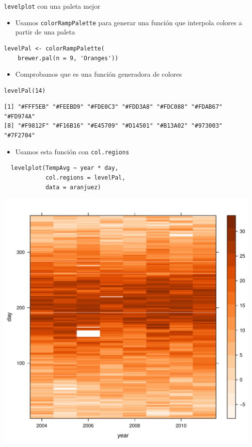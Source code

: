 \documentclass[xcolor={usenames,svgnames,dvipsnames}]{beamer}
\begin{document}
\begin{frame}[fragile,label=sec-2-1-36]{\texttt{levelplot} con una paleta mejor}
 \begin{itemize}
\item Usamos \texttt{colorRampPalette} para generar una función que interpola colores a partir de una paleta
\end{itemize}
\lstset{language=R,label= ,caption= ,numbers=none}
\begin{lstlisting}
levelPal <- colorRampPalette(
    brewer.pal(n = 9, 'Oranges'))
\end{lstlisting}
\begin{itemize}
\item Comprobamos que es una función generadora de colores
\end{itemize}

\lstset{language=R,label= ,caption= ,numbers=none}
\begin{lstlisting}
levelPal(14)
\end{lstlisting}

\begin{verbatim}
[1] "#FFF5EB" "#FEEBD9" "#FDE0C3" "#FDD3A8" "#FDC088" "#FDAB67" "#FD974A"
[8] "#F9812F" "#F16B16" "#E45709" "#D14501" "#B13A02" "#973003" "#7F2704"
\end{verbatim}

\begin{itemize}
\item Usamos esta función con \texttt{col.regions}
\end{itemize}
\lstset{language=R,label= ,caption= ,numbers=none}
\begin{lstlisting}
  levelplot(TempAvg ~ year * day,
            col.regions = levelPal,
            data = aranjuez)
\end{lstlisting}
\end{frame}

\begin{frame}[label=sec-2-1-37]{}
\includegraphics[width=.9\linewidth]{figs/levelplotPal.pdf}
\end{frame}
\end{document}
